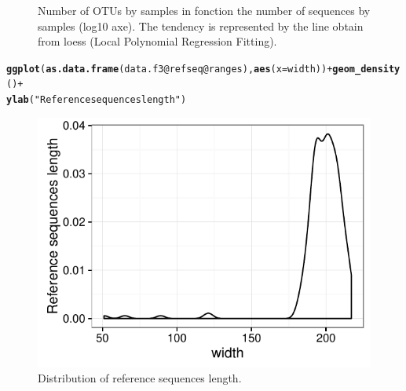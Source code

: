 \documentclass[12pt]{article}\usepackage[]{graphicx}\usepackage[]{color}
\makeatletter
\def\maxwidth{ %
  \ifdim\Gin@nat@width>\linewidth
    \linewidth
  \else
    \Gin@nat@width
  \fi
}
\newcommand{\hlstr}[1]{\textcolor[rgb]{0.192,0.494,0.8}{#1}}%
\newcommand{\hlopt}[1]{\textcolor[rgb]{0,0,0}{#1}}%
\newcommand{\hlstd}[1]{\textcolor[rgb]{0.345,0.345,0.345}{#1}}%
\newcommand{\hlkwc}[1]{\textcolor[rgb]{0.333,0.667,0.333}{#1}}%
\newcommand{\hlkwd}[1]{\textcolor[rgb]{0.737,0.353,0.396}{\textbf{#1}}}%
\newenvironment{kframe}{%
 \def\at@end@of@kframe{}%
 \ifinner\ifhmode%
  \def\at@end@of@kframe{\end{minipage}}%
  \begin{minipage}{\columnwidth}%
 \fi\fi%
 \def\FrameCommand##1{\hskip\@totalleftmargin \hskip-\fboxsep
 \colorbox{shadecolor}{##1}\hskip-\fboxsep
     \hskip-\linewidth \hskip-\@totalleftmargin \hskip\columnwidth}%
 \MakeFramed {\advance\hsize-\width
   \@totalleftmargin\z@ \linewidth\hsize
   \@setminipage}}%
 {\par\unskip\endMakeFramed%
 \at@end@of@kframe}
\newenvironment{knitrout}{}{} %
\numberwithin{figure}{section}
\makeatother
\begin{document}
\begin{knitrout}
\begin{figure}
{}

\caption[Number of OTUs by samples in fonction the number of sequences by samples (log10 axe)]{Number of OTUs by samples in fonction the number of sequences by samples (log10 axe). The tendency is represented by the line obtain from loess (Local Polynomial Regression Fitting).}\label{fig:unnamed-chunk-19}
\end{figure}


\end{knitrout}

\begin{knitrout}\small
{}\color{fgcolor}\begin{kframe}
\begin{alltt}
\hlkwd{ggplot}\hlstd{(}\hlkwd{as.data.frame}\hlstd{(data.f3}\hlopt{@}\hlkwc{refseq}\hlopt{@}\hlkwc{ranges}\hlstd{),} \hlkwd{aes}\hlstd{(}\hlkwc{x} \hlstd{= width))} \hlopt{+} \hlkwd{geom_density}\hlstd{()} \hlopt{+}
  \hlkwd{ylab}\hlstd{(}\hlstr{"Reference sequences length"}\hlstd{)}
\end{alltt}
\end{kframe}\begin{figure}

{\centering \includegraphics[width=\maxwidth]{figure/unnamed-chunk-20-1} 

}

\caption[Distribution of reference sequences length]{Distribution of reference sequences length.}\label{fig:unnamed-chunk-20}
\end{figure}


\end{knitrout}
 
\end{document}
